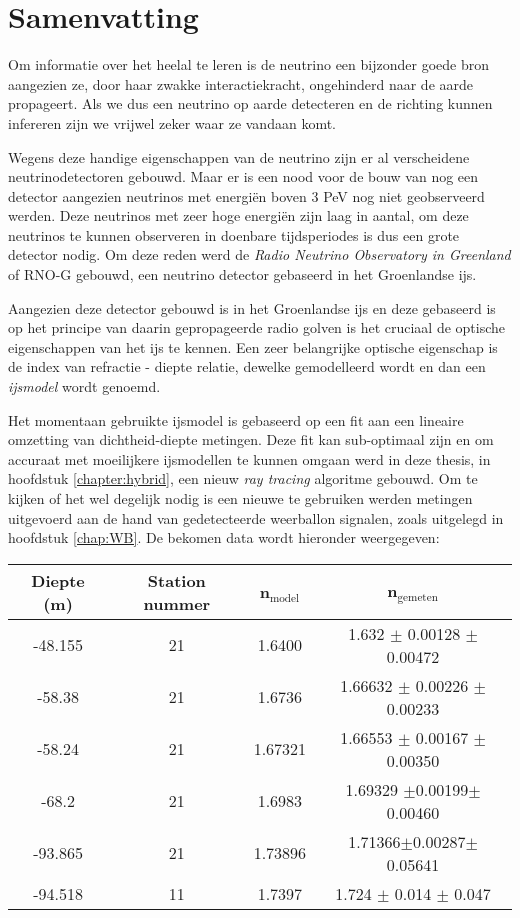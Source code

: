 \chapter*{Samenvatting}
Om informatie over het heelal te leren is de neutrino een bijzonder goede bron aangezien
ze, door haar zwakke interactiekracht, ongehinderd naar de aarde propageert.
Als we dus een neutrino op aarde detecteren en de richting kunnen infereren zijn we
vrijwel zeker waar ze vandaan komt.

Wegens deze handige eigenschappen van de neutrino zijn er al verscheidene neutrinodetectoren gebouwd.
Maar er is een nood voor de bouw van nog een detector aangezien neutrinos met energiën boven 3 PeV
nog niet geobserveerd werden. Deze neutrinos met zeer hoge energiën zijn laag in aantal,
om deze neutrinos te kunnen observeren in doenbare tijdsperiodes is dus een grote detector nodig.
Om deze reden werd de \textit{Radio Neutrino Observatory in Greenland} of RNO-G gebouwd, een 
neutrino detector gebaseerd in het Groenlandse ijs.

Aangezien deze detector gebouwd is in het Groenlandse ijs en deze gebaseerd is
op het principe van daarin gepropageerde radio golven is het cruciaal de
optische eigenschappen van het ijs te kennen. Een zeer belangrijke optische
eigenschap is de index van refractie - diepte relatie, dewelke gemodelleerd wordt
en dan een \textit{ijsmodel} wordt genoemd.

Het momentaan gebruikte ijsmodel is gebaseerd op een fit aan een lineaire omzetting van dichtheid-diepte metingen.
Deze fit kan sub-optimaal zijn en om accuraat met moeilijkere ijsmodellen
te kunnen omgaan werd in deze thesis, in hoofdstuk \ref{chapter:hybrid}, een nieuw \textit{ray tracing}
algoritme gebouwd. Om te kijken of het wel degelijk nodig is een nieuwe te gebruiken werden 
metingen uitgevoerd aan de hand van gedetecteerde weerballon signalen, zoals uitgelegd in hoofdstuk \ref{chap:WB}. 
De bekomen data wordt hieronder weergegeven:
\begin{center}
\begin{tabular}{||c c c c||}
 \hline
 Diepte (m) & Station nummer & n$_\text{model}$ & n$_\text{gemeten}$\\ [0.5ex]
 \hline\hline
 -48.155 & 21 & 1.6400 & 1.632 $\pm$ 0.00128 $\pm$ 0.00472\\
 -58.38 & 21 & 1.6736 & 1.66632 $\pm$ 0.00226 $\pm$ 0.00233 \\
 -58.24 & 21 & 1.67321 & 1.66553 $\pm$ 0.00167 $\pm$ 0.00350 \\
 -68.2 & 21 & 1.6983 & 1.69329 $\pm$0.00199$\pm$0.00460 \\
 -93.865 & 21 & 1.73896 & 1.71366$\pm$0.00287$\pm$0.05641\\
 -94.518 & 11 & 1.7397 & 1.724 $\pm$ 0.014 $\pm$ 0.047 \\
 \hline
\end{tabular}
\end{center}
